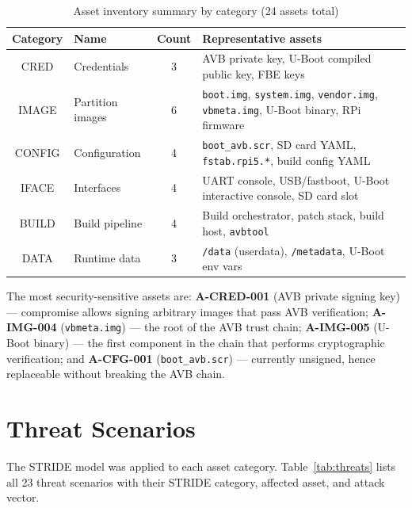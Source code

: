 \begin{table}[h]
\centering
\caption{Asset inventory summary by category (24 assets total)}
\label{tab:asset_summary}
\begin{tabularx}{\textwidth}{c l c >{\raggedright\arraybackslash}X}
\toprule
\textbf{Category} & \textbf{Name} & \textbf{Count} & \textbf{Representative assets} \\
\midrule
CRED    & Credentials  & 3 & AVB private key, U-Boot compiled public key, FBE keys \\
IMAGE   & Partition images & 6 & \texttt{boot.img}, \texttt{system.img}, \texttt{vendor.img}, \texttt{vbmeta.img}, U-Boot binary, RPi firmware \\
CONFIG  & Configuration  & 4 & \texttt{boot\_avb.scr}, SD card YAML, \texttt{fstab.rpi5.*}, build config YAML \\
IFACE   & Interfaces     & 4 & UART console, USB/fastboot, U-Boot interactive console, SD card slot \\
BUILD   & Build pipeline & 4 & Build orchestrator, patch stack, build host, \texttt{avbtool} \\
DATA    & Runtime data   & 3 & \texttt{/data} (userdata), \texttt{/metadata}, U-Boot env vars \\
\bottomrule
\end{tabularx}
\end{table}

The most security-sensitive assets are:
\textbf{A-CRED-001} (AVB private signing key) --- compromise allows signing arbitrary images that pass AVB verification;
\textbf{A-IMG-004} (\texttt{vbmeta.img}) --- the root of the AVB trust chain;
\textbf{A-IMG-005} (U-Boot binary) --- the first component in the chain that performs cryptographic verification; and
\textbf{A-CFG-001} (\texttt{boot\_avb.scr}) --- currently unsigned, hence replaceable without breaking the AVB chain.

\section{Threat Scenarios}
\label{sec:tara_threats}

The STRIDE model \cite{stride_microsoft} was applied to each asset category. Table~\ref{tab:threats} lists all 23 threat scenarios with their STRIDE category, affected asset, and attack vector.

